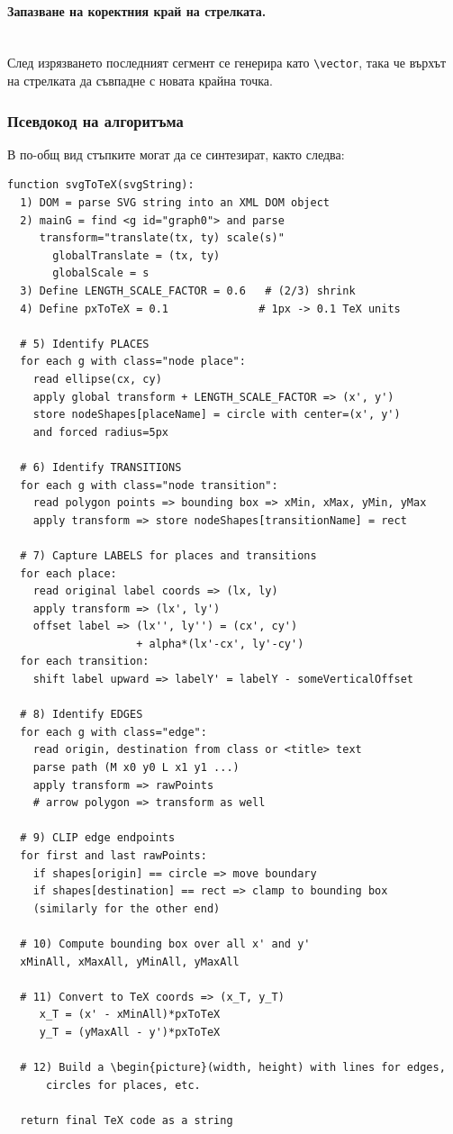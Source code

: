 \paragraph{Запазване на коректния край на стрелката.}
\mbox{}\\
След изрязването последният сегмент се генерира като \texttt{\textbackslash vector}, така че върхът на стрелката да съвпадне с новата крайна точка.

\subsubsection{Псевдокод на алгоритъма}

\noindent В по-общ вид стъпките могат да се синтезират, както следва:
\begin{verbatim}
function svgToTeX(svgString):
  1) DOM = parse SVG string into an XML DOM object
  2) mainG = find <g id="graph0"> and parse 
  	 transform="translate(tx, ty) scale(s)"
       globalTranslate = (tx, ty)
       globalScale = s
  3) Define LENGTH_SCALE_FACTOR = 0.6   # (2/3) shrink
  4) Define pxToTeX = 0.1              # 1px -> 0.1 TeX units

  # 5) Identify PLACES
  for each g with class="node place":
    read ellipse(cx, cy)
    apply global transform + LENGTH_SCALE_FACTOR => (x', y')
    store nodeShapes[placeName] = circle with center=(x', y') 
    and forced radius=5px

  # 6) Identify TRANSITIONS
  for each g with class="node transition":
    read polygon points => bounding box => xMin, xMax, yMin, yMax
    apply transform => store nodeShapes[transitionName] = rect

  # 7) Capture LABELS for places and transitions
  for each place:
    read original label coords => (lx, ly)
    apply transform => (lx', ly')
    offset label => (lx'', ly'') = (cx', cy') 
    				+ alpha*(lx'-cx', ly'-cy')
  for each transition:
    shift label upward => labelY' = labelY - someVerticalOffset

  # 8) Identify EDGES
  for each g with class="edge":
    read origin, destination from class or <title> text
    parse path (M x0 y0 L x1 y1 ...)
    apply transform => rawPoints
    # arrow polygon => transform as well

  # 9) CLIP edge endpoints
  for first and last rawPoints:
    if shapes[origin] == circle => move boundary
    if shapes[destination] == rect => clamp to bounding box
    (similarly for the other end)

  # 10) Compute bounding box over all x' and y'
  xMinAll, xMaxAll, yMinAll, yMaxAll

  # 11) Convert to TeX coords => (x_T, y_T)
     x_T = (x' - xMinAll)*pxToTeX
     y_T = (yMaxAll - y')*pxToTeX

  # 12) Build a \begin{picture}(width, height) with lines for edges,
      circles for places, etc.

  return final TeX code as a string
\end{verbatim}

